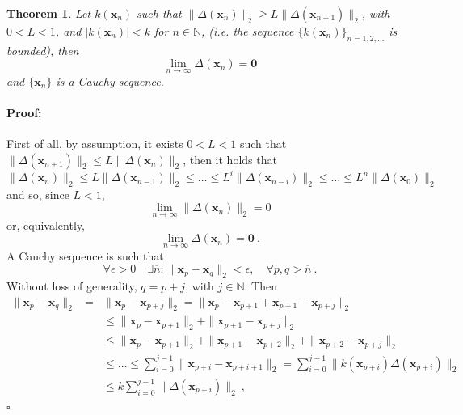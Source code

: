 \documentclass[preprint,11pt,authoryear]{elsarticle}
\newtheorem{theorem}{Theorem}%
\newenvironment{proof}{\paragraph{Proof:}}{\hfill$\square$}
\begin{document}
\begin{theorem}\label{main}
Let $k(\mathbf{x}_n)$ such that $\|\Delta( \mathbf{x}_n) \|_2 \geq L \|\Delta (\mathbf{x}_{n+1}) \|_2$, with $0<L<1$, and $|k(\mathbf{x}_n)| < k$ for $n \in \mathbb N$, (i.e. the sequence $\{k(\mathbf{x}_n)\}_{n=1,2,\dots} $ is bounded), then 
$$\lim_{n\rightarrow \infty} \Delta (\mathbf{x}_n)=\mathbf{0} $$
and $\{\mathbf{x}_n\}$ is a Cauchy sequence.
\end{theorem}
\begin{proof} {First of all, by assumption, it exists $0<L<1$ such that $\|\Delta(\mathbf x_{n+1})\|_2 \le L \|\Delta(\mathbf x_n)\|_2$, then it holds that
\begin{equation}\label{Delta_upper_bound}
\|\Delta(\mathbf x_{n}) \|_2 \le L \|\Delta(\mathbf x_{n-1} )\|_2 \le \dots\le  L^{i} \|\Delta(\mathbf x_{n-i} )\|_2\le\dots\le   L^n \|\Delta(\mathbf x_0)\|_2 
\end{equation}
and so, since $L<1$,
$$\lim_ {n\rightarrow \infty} \|\Delta (\mathbf{x}_n)\|_2=0$$
or, equivalently, 
$$\lim _{n\rightarrow \infty} \Delta (\mathbf{x}_n)=\mathbf{0}\ .$$
A Cauchy sequence is such that
$$\forall \epsilon > 0 \quad \exists \overline{n}: \| \mathbf{x}_p -  \mathbf{x}_q\|_2 < \epsilon, \quad \forall p,q > \overline{n} \ . $$
\vspace{5px}
Without loss of generality, $q = p + j$, with $j \in \mathbb{N}$. Then
\begin{eqnarray*}
\|   \mathbf{x}_p-  \mathbf{x}_q\|_2 &=&\|  \mathbf{x}_p- \mathbf  x_{p+j} \|_2 =\|  \mathbf{x}_p - \mathbf x_{p+1}+ \mathbf x_{p+1} -\mathbf  x_{p+j} \|_2 \\
&&\le \|  \mathbf{x}_p- \mathbf x_{p+1}\|_2 + \|\mathbf x_{p+1} - \mathbf x_{p+j} \|_2 \\
&&\le \|  \mathbf{x}_p- \mathbf x_{p+1}\|_2 + \|\mathbf x_{p+1} - \mathbf x_{p+2} \|_2 + \|\mathbf x_{p+2} - \mathbf x_{p+j} \|_2 \\
&&\le  \dots \le  \sum_{i = 0}^{j-1} \|\mathbf x_{p+i}-\mathbf x_{p+i+1}\|_2 = \sum_{i = 0}^{j-1} \|k(\mathbf{x}_{p+i})\Delta(\mathbf  x_{p+i})\|_2 \\
&& \le k \sum_{i = 0}^{j-1} \|\Delta (\mathbf x_{p+i})\|_2 \ ,

\end{eqnarray*}}
\end{proof}
\end{document}
